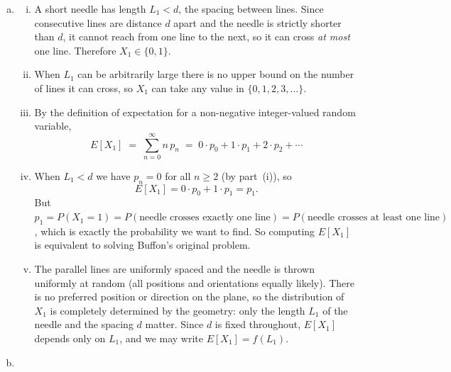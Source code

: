 \documentclass[12pt]{article}
\begin{document}
\begin{enumerate}[(a)]

  \item

  \begin{enumerate}[(i)]

    \item A short needle has length $L_1 < d$, the spacing between lines.
    Since consecutive lines are distance $d$ apart and the needle is
    strictly shorter than $d$, it cannot reach from one line to the next,
    so it can cross \emph{at most} one line. Therefore $X_1 \in \{0, 1\}$.

    \item When $L_1$ can be arbitrarily large there is no upper bound on
    the number of lines it can cross, so $X_1$ can take any value in
    $\{0, 1, 2, 3, \ldots\}$.

    \item By the definition of expectation for a non-negative integer-valued
    random variable,
    \[
      E[X_1] \;=\; \sum_{n=0}^{\infty} n\, p_n
              \;=\; 0 \cdot p_0 + 1 \cdot p_1 + 2 \cdot p_2 + \cdots
    \]

    \item When $L_1 < d$ we have $p_n = 0$ for all $n \geq 2$ (by
    part~(i)), so
    \[
      E[X_1] = 0 \cdot p_0 + 1 \cdot p_1 = p_1.
    \]
    But $p_1 = P(X_1 = 1) = P(\text{needle crosses exactly one line}) =
    P(\text{needle crosses at least one line})$, which is exactly the
    probability we want to find. So computing $E[X_1]$ is equivalent to
    solving Buffon's original problem.

    \item The parallel lines are uniformly spaced and the needle is thrown
    uniformly at random (all positions and orientations equally likely).
    There is no preferred position or direction on the plane, so the
    distribution of $X_1$ is completely determined by the geometry: only
    the length $L_1$ of the needle and the spacing $d$ matter.  Since $d$
    is fixed throughout, $E[X_1]$ depends only on $L_1$, and we may write
    $E[X_1] = f(L_1)$.

  \end{enumerate}

  \item

  \begin{enumerate}[(i)]


\end{enumerate}
\end{enumerate}
\end{document}
